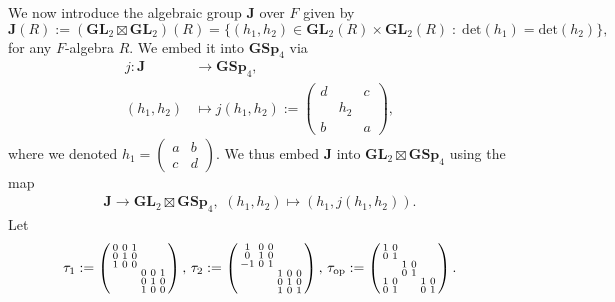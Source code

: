 \documentclass[11pt, reqno]{amsart}
\theoremstyle{plain}
\theoremstyle{definition}
\theoremstyle{remark}
\theoremstyle{plain}
\def\GSp{{\mathbf{GSp}}}
\def\GL{\mathbf{GL}}
\begin{document}
  
We now introduce the algebraic group $\mathbf{J}$ over $F$ given by
\[\mathbf{J}(R) := (\GL_2\boxtimes \GL_2)(R) = \{(h_1,h_2)\in \GL_2(R)\times \GL_2(R)\;:\;\mathrm{det}(h_1) = \mathrm{det}(h_2)\},\]
for any $F$-algebra $R$. We embed it into $\GSp_4$ via \begin{align*} j:\mathbf{J} &\to \GSp_4, \\ (h_1,h_2)&\mapsto  j(h_1,h_2) := \left(\begin{smallmatrix}
    d& &c\\ &h_2& \\ b& &a
\end{smallmatrix}\right),\end{align*}
where we denoted $h_1 = \left(\begin{smallmatrix}a&b\\c&d\end{smallmatrix}\right)$. We thus embed $\mathbf{J}$ into $\GL_2\boxtimes \GSp_4$ using the map
\begin{align}\label{Embedding:On:GSp4} \mathbf{J} \to \GL_2\boxtimes \GSp_4, \,\, (h_1,h_2)\mapsto  (h_1, j(h_1,h_2)).\end{align}
Let 
\begin{align}\label{def_open_orbit_forJR}
    \tau_{1} := \left(\begin{smallmatrix}0&0&1&&&\\0&1&0&&&\\1&0&0&&&\\ &&&0&0&1\\&&&0&1&0\\&&&1&0&0 \end{smallmatrix}\right),\, \tau_{2} := \left(\begin{smallmatrix}1&0&0&&&\\0&1&0&&&\\-1&0&1&&&\\ &&&1&0&0\\&&&0&1&0\\&&&1&0&1 \end{smallmatrix}\right),\,  \tau_{\rm op} := \left(\begin{smallmatrix}1&0&&&&\\0&1&&&&\\&&1&0&&\\ &&0&1&&\\1&0&&&1&0\\0&1&&&0&1 \end{smallmatrix}\right).
\end{align} 
\end{document}
